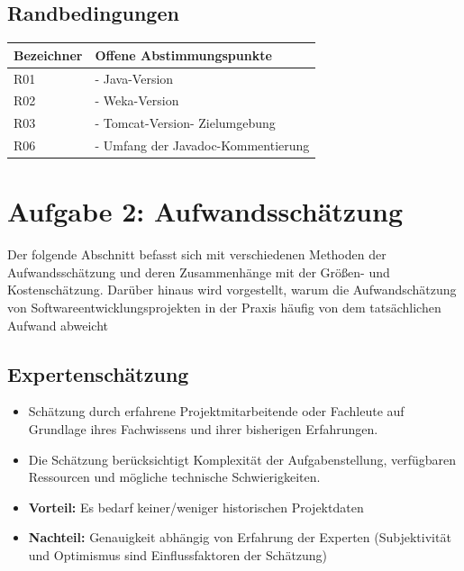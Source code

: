 \documentclass[a4paper,10pt]{article}
\begin{document}
        \subsection*{Randbedingungen}
        \begin{longtable}{>{\raggedright\arraybackslash}p{}>{\raggedright\arraybackslash}p{}}
            \toprule
            \textbf{Bezeichner} & \textbf{Offene Abstimmungspunkte}       \\
            \midrule\endhead
            \bottomrule\endfoot
            R01                 & - Java-Version                          \\
            \midrule
            R02                 & - Weka-Version                          \\
            \midrule
            R03                 & - Tomcat-Version\newline - Zielumgebung \\
            \midrule
            R06                 & - Umfang der Javadoc-Kommentierung      \\
        \end{longtable}\newpage


        \section*{Aufgabe 2: Aufwandsschätzung}

        Der folgende Abschnitt befasst sich mit verschiedenen Methoden der Aufwandsschätzung und deren Zusammenhänge mit der Grö\ss{}en- und Kostenschätzung.
    Darüber hinaus wird vorgestellt, warum die Aufwandschätzung von Softwareentwicklungsprojekten in der Praxis häufig von dem tatsächlichen Aufwand abweicht\\
        \newline

        \subsection*{Expertenschätzung}
        \begin{itemize}
            \item Schätzung durch erfahrene Projektmitarbeitende oder Fachleute auf Grundlage ihres Fachwissens und ihrer bisherigen Erfahrungen.
            \item Die Schätzung berücksichtigt Komplexität der Aufgabenstellung, verfügbaren Ressourcen und mögliche technische Schwierigkeiten.
            \item \textbf{Vorteil:} Es bedarf keiner/weniger historischen Projektdaten
            \item \textbf{Nachteil:} Genauigkeit abhängig von Erfahrung der Experten (Subjektivität und Optimismus sind Einflussfaktoren der Schätzung)
        \end{itemize}
\end{document}
